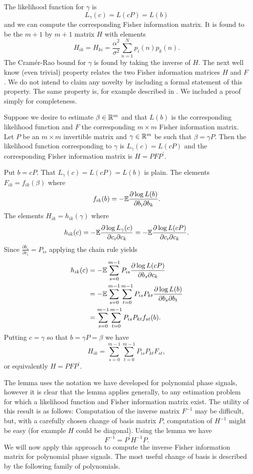 \documentclass[journal,10pt]{IEEEtran}
\begin{document}
The likelihood function for $\gamma$ is 
\[
L_\gamma(c) = L(cP) = L(b)
\] 
and we can compute the corresponding Fisher information matrix.  It is found to be the $m+1$ by $m+1$ matrix $H$ with elements
\[
H_{ik} = H_{ki} = \frac{\alpha^2}{\sigma^2}\sum_{n=1}^{N} p_{i}(n) p_{k}(n).
\]
The Cram\'{e}r-Rao bound for $\gamma$ is found by taking the inverse of $H$.  The next well know (even trivial) property relates the two Fisher information matrices $H$ and $F$.  We do not intend to claim any novelty by including a formal statement of this property.  The same property is, for example described in \cite[]{Kay1993_stat_sig_est_theory}.  We included a proof simply for completeness.

\begin{property}
Suppose we desire to estimate $\beta \in {\mathbb R}^m$ and that $L(b)$ is the corresponding likelihood function and $F$ the corresponding $m \times m$ Fisher information matrix.  Let $P$ be an $m \times m$ invertible matrix and $\gamma \in {\mathbb R}^m$ be such that $\beta = \gamma P$.  Then the likelihood function corresponding to $\gamma$ is $L_\gamma(c) = L(cP)$ and the corresponding Fisher information matrix is $H = P F P^\prime$. 
\end{property}
\begin{IEEEproof}
Put $b = cP$.  That $L_\gamma(c) = L(cP) = L(b)$ is plain.  The elements $F_{ik} = f_{ik}(\beta)$ where
\[
f_{ik}(b) = -{\mathbb E} \frac{\partial \log L(b)}{\partial b_i \partial b_k}.
\]
The elements $H_{ik} = h_{ik}(\gamma)$ where
\[
h_{ik}(c) = -{\mathbb E} \frac{\partial \log L_\gamma(c)}{\partial c_i \partial c_k} =  -{\mathbb E} \frac{\partial \log L(cP)}{\partial c_i \partial c_k}.
\]
Since $\frac{\partial b_s}{\partial c_i} = P_{is}$ applying the chain rule yields
\begin{align*}
h_{ik}(c) &= -{\mathbb E} \sum_{s=0}^{m-1} P_{is}\frac{\partial \log L(cP)}{\partial b_s \partial c_k} \\
&= -{\mathbb E} \sum_{s=0}^{m-1}\sum_{t=0}^{m-1} P_{is} P_{kt}   \frac{\partial \log L(b)}{\partial b_s \partial b_t} \\
&= \sum_{s=0}^{m-1}\sum_{t=0}^{m-1} P_{is} P_{kt}  f_{st}(b).
\end{align*}
Putting $c = \gamma$ so that $b = \gamma P = \beta$ we have
\[
H_{ik} = \sum_{s=0}^{m-1}\sum_{t=0}^{m-1} P_{is} P_{kt}  F_{st},
\]
or equivalently $H = P F P^\prime$.
\end{IEEEproof}

The lemma uses the notation we have developed for polynomial phase signals, however it is clear that the lemma applies generally, to any estimation problem for which a likelihood function and Fisher information matrix exist.  The utility of this result is as follows:  Computation of the inverse matrix $F^{-1}$ may be difficult, but, with a carefully chosen change of basis matrix $P$, computation of $H^{-1}$ might be easy (for example $H$ could be diagonal).  Using the lemma we have 
\[
F^{-1} = P^\prime H^{-1} P.
\]  
We will now apply this approach to compute the inverse Fisher information matrix for polynomial phase signals.  The most useful change of basis is described by the following family of polynomials.
\end{document}
